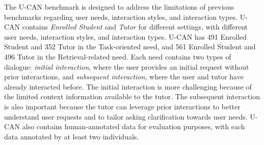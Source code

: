 \documentclass{article} %
\theoremstyle{definition}
\begin{document}
\begin{table}[t]
  \begin{center}
    \caption{Summary of similar work, where ``'' means ``not satisfied'' and ``'' means ``satisfied''.}
    \label{tab:dataset}
    \setlength{\belowcaptionskip}{-2cm}
    \setlength{\tabcolsep}{6pt}
  \end{center}
\end{table}

The U-CAN benchmark is designed to address the limitations of previous benchmarks regarding user needs, interaction styles, and interaction types. U-CAN contains \textit{Enrolled Student} and \textit{Tutor} for different settings, with different user needs, interaction styles, and interaction types.
U-CAN has 491 Enrolled Student and 352 Tutor in the Task-oriented need, and 561 Enrolled Student and 496 Tutor in the Retrieval-related need.
Each need contains two types of dialogue: \textit{initial interaction}, where the user provides an initial request without prior interactions, and \textit{subsequent interaction}, where the user and tutor have already interacted before.
The initial interaction is more challenging because of the limited context information available to the tutor.
The subsequent interaction is also important because the tutor can leverage prior interactions to better understand user requests and to tailor asking clarification towards user needs.
U-CAN also contains human-annotated data for evaluation purposes, with each data annotated by at least two individuals.
\end{document}
